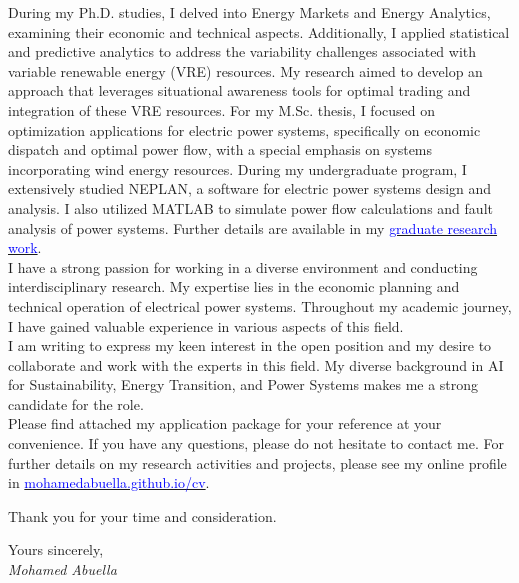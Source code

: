 \documentclass[11pt,letterpaper,sans]{moderncv}
\begin{document}
During my Ph.D. studies, I delved into Energy Markets and Energy Analytics, examining their economic and technical aspects. Additionally, I applied statistical and predictive analytics to address the variability challenges associated with variable renewable energy (VRE) resources. My research aimed to develop an approach that leverages situational awareness tools for optimal trading and integration of these VRE resources.
For my M.Sc. thesis, I focused on optimization applications for electric power systems, specifically on economic dispatch and optimal power flow, with a special emphasis on systems incorporating wind energy resources.
During my undergraduate program, I extensively studied NEPLAN, a software for electric power systems design and analysis. I also utilized MATLAB to simulate power flow calculations and fault analysis of power systems.
Further details are available in my
\href{https://mohamedabuella.github.io/blog/2021/06/30/MSc_PhD_Research_in_Energy_Analytics} {\textcolor{blue}{graduate research work}}.
\\

I have a strong passion for working in a diverse environment and conducting interdisciplinary research. My expertise lies in the economic planning and technical operation of electrical power systems. Throughout my academic journey, I have gained valuable experience in various aspects of this field.
\\

I am writing to express my keen interest in the open position and my desire to collaborate and work with the experts in this field. My diverse background in AI for Sustainability, Energy Transition, and Power Systems makes me a strong candidate for the role.
\\

Please find attached my application package for your reference at your convenience. If you have any questions, please do not hesitate to contact me.
For further details on my research activities and projects, please see my online profile in
\href{https://mohamedabuella.github.io/cv/}{\textcolor{blue}{mohamedabuella.github.io/cv}}.

\vspace{1ex}

Thank you for your time and consideration.

\vspace{2ex}

Yours sincerely,\\[1ex]
\textit{Mohamed Abuella}
\end{document}
